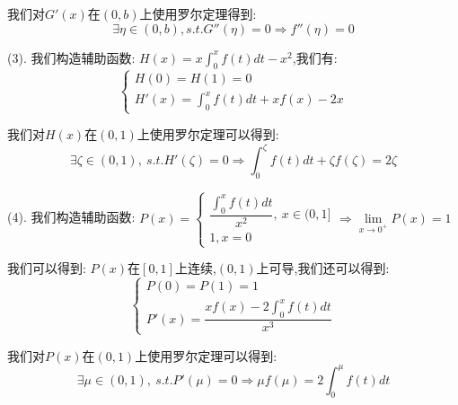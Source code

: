 \begin{solution}
	我们对$G'(x)$在$(0,b)$上使用罗尔定理得到:  
	$$\exists \eta\in(0,b),s.t. G''(\eta)=0\Rightarrow f''(\eta)=0$$
	
	(3). 我们构造辅助函数:  $H(x)=x\int_{0}^{x}f(t)dt-x^2$,我们有:  
	$$\left\lbrace
	\begin{array}{l}
		H(0)=H(1)=0\\
		H'(x)=\int_{0}^{x}f(t)dt+xf(x)-2x
	\end{array}
	\right. $$
	
	我们对$H(x)$在$(0,1)$上使用罗尔定理可以得到:  
	$$\exists \zeta\in(0,1),\ s.t. H'(\zeta)=0\Rightarrow \int_{0}^{\zeta}f(t)dt+\zeta f(\zeta)=2\zeta$$
	
	(4). 我们构造辅助函数:  $P(x)=\left\lbrace
	\begin{array}{l}
		\dfrac{\int_{0}^{x}f(t)dt}{x^2},\ x\in(0,1]\\
		1,x=0
	\end{array}
	\right. \Rightarrow \lim\limits_{x\rightarrow 0^{+}}P(x)=1$
	
	我们可以得到:  $P(x)$在$[0,1]$上连续,$(0,1)$上可导,我们还可以得到:  
	$$\left\lbrace
	\begin{array}{l}
		P(0)=P(1)=1\\
		P'(x)=\dfrac{xf(x)-2\int_{0}^{x}f(t)dt}{x^3}
	\end{array}
	\right. $$
	
	我们对$P(x)$在$(0,1)$上使用罗尔定理可以得到:  
	$$\exists \mu\in(0,1),\ s.t. P'(\mu)=0\Rightarrow \mu f(\mu)=2\int_{0}^{\mu}f(t)dt$$
\end{solution}
